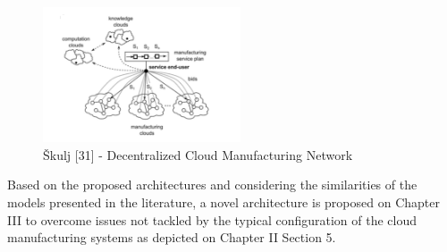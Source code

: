 \begin{figure}[h]
    \centering
    \includegraphics[height=4cm, keepaspectratio]{images/skulj-cmdna}
    \caption{Škulj [31] - Decentralized Cloud Manufacturing Network}
    \label{fig:skulj-cmdna}
\end{figure}

Based on the proposed architectures and considering the similarities of the models presented in the literature, a novel architecture is proposed on Chapter III to overcome issues not tackled by the typical configuration of the cloud manufacturing systems as depicted on Chapter II Section 5.

